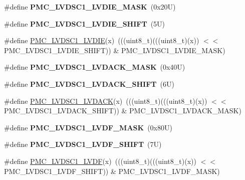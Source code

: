 \begin{DoxyCompactItemize}
\item 
\mbox{\label{group___p_m_c___register___masks_ga1e7518c88ea0037d099124a643788363}} 
\#define {\bfseries P\+M\+C\+\_\+\+L\+V\+D\+S\+C1\+\_\+\+L\+V\+D\+I\+E\+\_\+\+M\+A\+SK}~(0x20\+U)
\item 
\mbox{\label{group___p_m_c___register___masks_ga30ca240c9254a7e76123a3cf2bfdc40e}} 
\#define {\bfseries P\+M\+C\+\_\+\+L\+V\+D\+S\+C1\+\_\+\+L\+V\+D\+I\+E\+\_\+\+S\+H\+I\+FT}~(5\+U)
\item 
\#define \mbox{\hyperlink{group___p_m_c___register___masks_gaca76bd97c7883297f5b00061a1cc0578}{P\+M\+C\+\_\+\+L\+V\+D\+S\+C1\+\_\+\+L\+V\+D\+IE}}(x)~(((uint8\+\_\+t)(((uint8\+\_\+t)(x)) $<$$<$ P\+M\+C\+\_\+\+L\+V\+D\+S\+C1\+\_\+\+L\+V\+D\+I\+E\+\_\+\+S\+H\+I\+FT)) \& P\+M\+C\+\_\+\+L\+V\+D\+S\+C1\+\_\+\+L\+V\+D\+I\+E\+\_\+\+M\+A\+SK)
\item 
\mbox{\label{group___p_m_c___register___masks_ga65d04677ca16ad916563d6673cb8ecaa}} 
\#define {\bfseries P\+M\+C\+\_\+\+L\+V\+D\+S\+C1\+\_\+\+L\+V\+D\+A\+C\+K\+\_\+\+M\+A\+SK}~(0x40\+U)
\item 
\mbox{\label{group___p_m_c___register___masks_ga56654042b7934ca0e6c51f21db7d1201}} 
\#define {\bfseries P\+M\+C\+\_\+\+L\+V\+D\+S\+C1\+\_\+\+L\+V\+D\+A\+C\+K\+\_\+\+S\+H\+I\+FT}~(6\+U)
\item 
\#define \mbox{\hyperlink{group___p_m_c___register___masks_gaac6d13822cd8df0c6dcd9538aa820a6b}{P\+M\+C\+\_\+\+L\+V\+D\+S\+C1\+\_\+\+L\+V\+D\+A\+CK}}(x)~(((uint8\+\_\+t)(((uint8\+\_\+t)(x)) $<$$<$ P\+M\+C\+\_\+\+L\+V\+D\+S\+C1\+\_\+\+L\+V\+D\+A\+C\+K\+\_\+\+S\+H\+I\+FT)) \& P\+M\+C\+\_\+\+L\+V\+D\+S\+C1\+\_\+\+L\+V\+D\+A\+C\+K\+\_\+\+M\+A\+SK)
\item 
\mbox{\label{group___p_m_c___register___masks_ga44ae12d2d3e732cd25a897092a7e9ada}} 
\#define {\bfseries P\+M\+C\+\_\+\+L\+V\+D\+S\+C1\+\_\+\+L\+V\+D\+F\+\_\+\+M\+A\+SK}~(0x80\+U)
\item 
\mbox{\label{group___p_m_c___register___masks_ga75efd4534766aaa126efff96d241de61}} 
\#define {\bfseries P\+M\+C\+\_\+\+L\+V\+D\+S\+C1\+\_\+\+L\+V\+D\+F\+\_\+\+S\+H\+I\+FT}~(7\+U)
\item 
\#define \mbox{\hyperlink{group___p_m_c___register___masks_ga9deb83dbe1f7f6415f842750016bd408}{P\+M\+C\+\_\+\+L\+V\+D\+S\+C1\+\_\+\+L\+V\+DF}}(x)~(((uint8\+\_\+t)(((uint8\+\_\+t)(x)) $<$$<$ P\+M\+C\+\_\+\+L\+V\+D\+S\+C1\+\_\+\+L\+V\+D\+F\+\_\+\+S\+H\+I\+FT)) \& P\+M\+C\+\_\+\+L\+V\+D\+S\+C1\+\_\+\+L\+V\+D\+F\+\_\+\+M\+A\+SK)
\end{DoxyCompactItemize}
